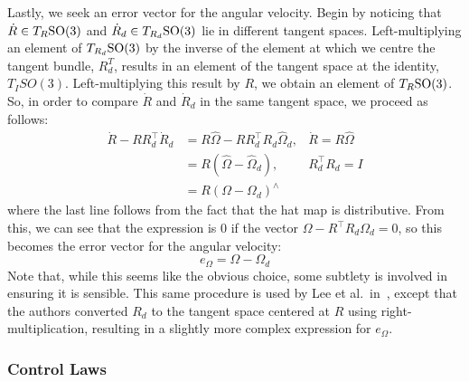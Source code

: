 Lastly, we seek an error vector for the angular velocity. Begin by noticing that ${\dot{R} \in T_R \text{SO}(3)}$ and ${\dot{R}_d \in T_{R_d} \text{SO}(3)}$ lie in different tangent spaces. Left-multiplying an element of $T_{R_d}\text{SO}(3)$ by the inverse of the element at which we centre the tangent bundle, $R_d^T$, results in an element of the tangent space at the identity, $T_{I}SO(3)$. Left-multiplying this result by $R$, we obtain an element of $T_R\text{SO}(3)$. So, in order to compare $\dot{R}$ and $\dot{R}_d$ in the same tangent space, we proceed as follows:
\begin{align}
    \dot{R} - R R_d^\top \dot{R}_d
        &= R\hat{\Omega} - R R_d^\top R_d \hat{\Omega}_d, 
            &\dot{R} = R \hat{\Omega} \\
        &=  R(\hat{\Omega} - \hat{\Omega}_d), 
            & R_d^\top R_d = I \\
        &= R{(\Omega - \Omega_d)}^\wedge
\end{align}
where the last line follows from the fact that the hat map is distributive. From this, we can see that the expression is 0 if the vector $\Omega - R^\top R_d \Omega_d = 0$, so this becomes the error vector for the angular velocity:
\begin{equation}
    e_\Omega = \Omega - \Omega_d
\end{equation}
Note that, while this seems like the obvious choice, some subtlety is involved in ensuring it is sensible. This same procedure is used by Lee et al.\ in~\cite{Lee2010}, except that the authors converted $R_d$ to the tangent space centered at $R$ using right-multiplication, resulting in a slightly more complex expression for $e_\Omega$.


\subsubsection{Control Laws}

